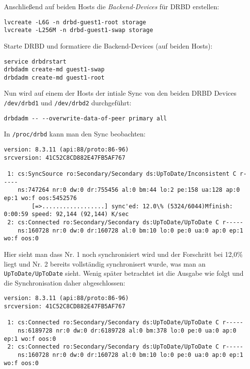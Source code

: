 Anschließend auf beiden Hosts die \emph{Backend-Devices} für DRBD erstellen:
\setupVerbatimOut
\begin{verbatim}
lvcreate -L6G -n drbd-guest1-root storage
lvcreate -L256M -n drbd-guest1-swap storage
\end{verbatim}

Starte DRBD und formatiere die Backend-Devices (auf beiden Hosts):

\setupVerbatimOut
\begin{verbatim}
service drbdrstart
drbdadm create-md guest1-swap
drbdadm create-md guest1-root
\end{verbatim}


Nun wird auf einem der Hosts der intiale Sync von den beiden DRBD Devices \verb#/dev/drbd1# und \verb#/dev/drbd2# durchgeführt:

\setupVerbatimOut
\begin{verbatim}
drbdadm -- --overwrite-data-of-peer primary all
\end{verbatim}
In \verb#/proc/drbd# kann man den Sync beobachten:

\setupVerbatimOut
\begin{verbatim}
version: 8.3.11 (api:88/proto:86-96)
srcversion: 41C52C8CD882E47FB5AF767 

 1: cs:SyncSource ro:Secondary/Secondary ds:UpToDate/Inconsistent C r-----
    ns:747264 nr:0 dw:0 dr:755456 al:0 bm:44 lo:2 pe:158 ua:128 ap:0 ep:1 wo:f oos:5452576
        [=>..................] sync'ed: 12.0\% (5324/6044)Mfinish: 0:00:59 speed: 92,144 (92,144) K/sec
 2: cs:Connected ro:Secondary/Secondary ds:UpToDate/UpToDate C r-----
    ns:160728 nr:0 dw:0 dr:160728 al:0 bm:10 lo:0 pe:0 ua:0 ap:0 ep:1 wo:f oos:0
\end{verbatim}
Hier sieht man dass Nr. 1 noch synchronisiert wird und der  Forschritt bei 12,0\% liegt und  Nr. 2 bereits vollständig synchronisert wurde, was man an \verb#UpToDate/UpToDate# sieht.
Wenig später betrachtet ist die Ausgabe wie folgt und die Synchronisation daher abgeschlossen:

\setupVerbatimOut
\begin{verbatim}
version: 8.3.11 (api:88/proto:86-96)
srcversion: 41C52C8CD882E47FB5AF767 

 1: cs:Connected ro:Secondary/Secondary ds:UpToDate/UpToDate C r-----
    ns:6189728 nr:0 dw:0 dr:6189728 al:0 bm:378 lo:0 pe:0 ua:0 ap:0 ep:1 wo:f oos:0
 2: cs:Connected ro:Secondary/Secondary ds:UpToDate/UpToDate C r-----
    ns:160728 nr:0 dw:0 dr:160728 al:0 bm:10 lo:0 pe:0 ua:0 ap:0 ep:1 wo:f oos:0
\end{verbatim}


